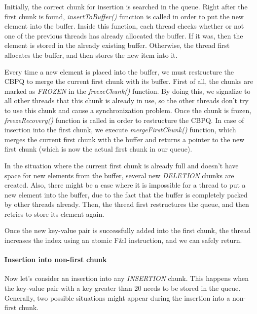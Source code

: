 \documentclass{article}
\begin{document}
  Initially, the correct chunk for insertion is searched in the queue. Right after the first chunk is found, \textit{insertToBuffer()} function is called in order to put the new element into the buffer. Inside this function, each thread checks whether or not one of the previous threads has already allocated the buffer. If it was, then the element is stored in the already existing buffer. Otherwise, the thread first allocates the buffer, and then stores the new item into it.\par

  Every time a new element is placed into the buffer, we must restructure the CBPQ to merge the current first chunk with its buffer. First of all, the chunks are marked as \emph{FROZEN} in the \textit{freezeChunk()} function. By doing this, we signalize to all other threads that this chunk is already in use, so the other threads don't try to use this chunk and cause a synchronization problem. Once the chunk is frozen, \textit{freezeRecovery()} function is called in order to restructure the CBPQ. In case of insertion into the first chunk, we execute \textit{mergeFirstChunk()} function, which merges the current first chunk with the buffer and returns a pointer to the new first chunk (which is now the actual first chunk in our queue).\par

  In the situation where the current first chunk is already full and doesn't have space for new elements from the buffer, several new \emph{DELETION} chunks are created. Also, there might be a case where it is impossible for a thread to put a new element into the buffer, due to the fact that the buffer is completely packed by other threads already. Then, the thread first restructures the queue, and then retries to store its element again.\par

  Once the new key-value pair is successfully added into the first chunk, the thread increases the index using an atomic F\&I instruction, and we can safely return.

  \paragraph{Insertion into non-first chunk}\mbox{}\par

  Now let's consider an insertion into any \emph{INSERTION} chunk. This happens when the key-value pair with a key greater than 20 needs to be stored in the queue. Generally, two possible situations might appear during the insertion into a non-first chunk.\par
\end{document}
